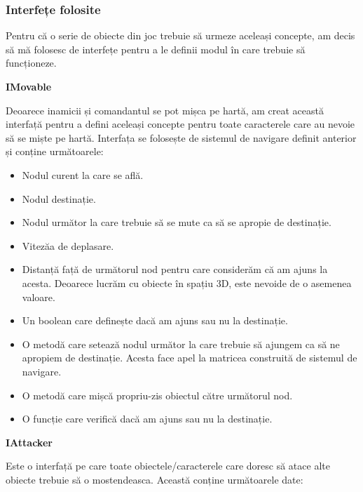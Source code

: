 \documentclass[12pt, a4paper]{article}
\begin{document}
	
	
	\subsubsection{Interfețe folosite}
	
	Pentru că o serie de obiecte din joc trebuie să urmeze aceleași concepte, am decis să mă folosesc de interfețe pentru a le definii modul în care trebuie să funcționeze. 
	\newline
	
	\textbf{IMovable}
	
	Deoarece inamicii și comandantul se pot mișca pe hartă, am creat această interfață pentru a defini aceleași concepte pentru toate caracterele care au nevoie să se miște pe hartă. Interfața se folosește de sistemul de navigare definit anterior și conține următoarele:
	
	\begin{itemize}
		\item Nodul curent la care se află.
		\item Nodul destinație.
		\item Nodul următor la care trebuie să se mute ca să se apropie de destinație.
		\item Vitezăa de deplasare.
		\item Distanță față de următorul nod pentru care considerăm că am ajuns la acesta. Deoarece lucrăm cu obiecte în spațiu 3D, este nevoide de o asemenea valoare.
		\item Un boolean care definește dacă am ajuns sau nu la destinație.
		\item O metodă care setează nodul următor la care trebuie să ajungem ca să ne apropiem de destinație. Acesta face apel la matricea construită de sistemul de navigare.
		\item O metodă care mișcă propriu-zis obiectul către următorul nod.
		\item O funcție care verifică dacă am ajuns sau nu la destinație.
	\end{itemize}
	\bigskip
	
	
	\textbf{IAttacker}
	
	Este o interfață pe care toate obiectele/caracterele care doresc să atace alte obiecte trebuie să o mostendeasca. Această conține următoarele date:
	
\end{document}
